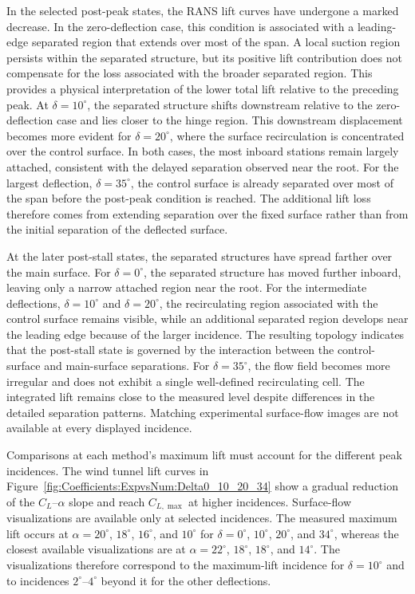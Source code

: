 \documentclass[journal ]{new-aiaa}
\DeclareRobustCommand{\DeltaSimple}[1]{%
  \ensuremath{\delta=#1^\circ}%
}
\begin{document}
In the selected post-peak states, the RANS lift curves have undergone a marked decrease.
In the zero-deflection case, this condition is associated with a leading-edge separated region that extends over most of the span.
A local suction region persists within the separated structure, but its positive lift contribution does not compensate for the loss associated with the broader separated region. This provides a physical interpretation of the lower total lift relative to the preceding peak.
At \(\delta=10^\circ\), the separated structure shifts downstream relative to the zero-deflection case and lies closer to the hinge region.
This downstream displacement becomes more evident for \(\DeltaSimple{20}\), where the surface recirculation is concentrated over the control surface.
In both cases, the most inboard stations remain largely attached, consistent with the delayed separation observed near the root.
For the largest deflection, \(\DeltaSimple{35}\), the control surface is already separated over most of the span before the post-peak condition is reached.
The additional lift loss therefore comes from extending separation over the fixed surface rather than from the initial separation of the deflected surface.

At the later post-stall states, the separated structures have spread farther over the main surface.
For \(\delta=0^\circ\), the separated structure has moved further inboard, leaving only a narrow attached region near the root.
For the intermediate deflections, \(\DeltaSimple{10}\) and \(\DeltaSimple{20}\), the recirculating region associated with the control surface remains visible, while an additional separated region develops near the leading edge because of the larger incidence.
The resulting topology indicates that the post-stall state is governed by the interaction between the control-surface and main-surface separations.
For \(\DeltaSimple{35}\), the flow field becomes more irregular and does not exhibit a single well-defined recirculating cell.
The integrated lift remains close to the measured level despite differences in the detailed separation patterns. Matching experimental surface-flow images are not available at every displayed incidence.

Comparisons at each method's maximum lift must account for the different peak incidences.
The wind tunnel lift curves in Figure~\ref{fig:Coefficients:ExpvsNum:Delta0_10_20_34} show a gradual reduction of the \(C_L\)--\(\alpha\) slope and reach \(C_{L,\max}\) at higher incidences.
Surface-flow visualizations are available only at selected incidences.
The measured maximum lift occurs at \(\alpha=20^\circ\), \(18^\circ\), \(16^\circ\), and \(10^\circ\) for \(\delta=0^\circ\), \(10^\circ\), \(20^\circ\), and \(34^\circ\), whereas the closest available visualizations are at \(\alpha=22^\circ\), \(18^\circ\), \(18^\circ\), and \(14^\circ\).
The visualizations therefore correspond to the maximum-lift incidence for \(\delta=10^\circ\) and to incidences \(2^\circ\)--\(4^\circ\) beyond it for the other deflections.
\end{document}

